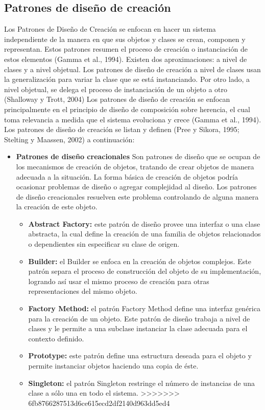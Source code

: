\documentclass[twoside,twocolumn]{article}
\begin{document}
\begin{itemize}
\subsection{Patrones de diseño de creación}
Los Patrones de Diseño de Creación se enfocan en hacer un sistema independiente de la manera en que sus objetos y clases se crean, componen y representan. Estos patrones resumen el proceso de creación o instanciación de estos elementos (Gamma et al., 1994). Existen dos aproximaciones: a nivel de clases y a nivel objetual. Los patrones de diseño de creación a nivel de clases usan la generalización para variar la clase que se está instanciando. Por otro lado, a nivel objetual, se delega el proceso de instanciación de un objeto a otro (Shalloway y Trott, 2004) 
Los patrones de diseño de creación se enfocan principalmente en el principio de diseño de composición sobre herencia, el cual toma relevancia a medida que el sistema evoluciona y crece (Gamma et al., 1994). Los patrones de diseño de creación se listan y definen (Pree y Sikora, 1995; Stelting y Maassen, 2002) a continuación: 	

\begin{itemize}

    \item \textbf{Patrones de diseño creacionales} 
    Son patrones de diseño que se ocupan de los mecanismos de creación de objetos, tratando de crear objetos de manera adecuada a la situación. La forma básica de creación de objetos podría ocasionar problemas de diseño o agregar complejidad al diseño. Los patrones de diseño creacionales resuelven este problema controlando de alguna manera la creación de este objeto.
    \begin{itemize}
		\item \textbf{Abstract Factory:}	este patrón de diseño provee una interfaz o una clase abstracta, la cual define la creación de una familia de objetos relacionados o dependientes sin especificar su clase de origen. 
		\item \textbf{Builder:} el Builder se enfoca en la creación de objetos complejos. Este patrón separa el proceso de construcción del objeto de su implementación, logrando así usar el mismo proceso de creación para otras representaciones del mismo objeto.  
		\item \textbf{Factory Method:} el patrón Factory Method define una interfaz genérica para la creación de un objeto. Este patrón de diseño trabaja a nivel de clases y le permite a una subclase instanciar la clase adecuada para el contexto definido.  
		\item \textbf{Prototype:}	este patrón define una estructura deseada para el objeto y permite instanciar objetos haciendo una copia de éste.  
		\item \textbf{Singleton:} el patrón Singleton restringe el número de instancias de una clase a sólo una en todo el sistema. 
>>>>>>> 6fb8766287513d6ce615ecd2df2140d963dd5ed4
    \end{itemize}


\end{itemize}
\end{itemize}
\end{document}
